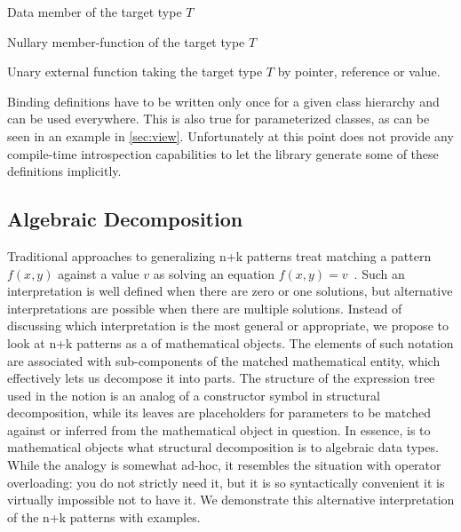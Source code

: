 \begin{compactitem}
\setlength{\itemsep}{0pt}
\setlength{\parskip}{0pt}
\item Data member of the target type $T$
\item Nullary member-function of the target type $T$
\item Unary external function taking the target type $T$ by pointer, reference or value.
\end{compactitem}

\noindent
Binding definitions have to be written only once for a given class hierarchy and 
can be used everywhere. This is also true for parameterized classes, as can be 
seen in an example in \textsection\ref{sec:view}. Unfortunately at this point 
\Cpp{} does not provide any compile-time introspection capabilities to let the 
library generate some of these definitions implicitly.

\subsection{Algebraic Decomposition}
\label{sec:slv}

Traditional approaches to generalizing n+k patterns treat matching a pattern 
$f(x,y)$ against a value $v$ as solving an equation $f(x,y)=v$~\cite{OosterhofThesis}. 
Such an interpretation is well defined when there are zero or one solutions,
but alternative interpretations are possible when there are multiple solutions. 
Instead of discussing which interpretation is the most general or appropriate, 
we propose to look at n+k patterns as a  of 
mathematical objects. The elements of such notation are associated with 
sub-components of the matched mathematical entity, which effectively lets us 
decompose it into parts. The structure of the expression tree used in the notion
is an analog of a constructor symbol in structural decomposition, while its 
leaves are placeholders for parameters to be matched against or inferred from 
the mathematical object in question. In essence,  
is to mathematical objects what structural decomposition is to algebraic data 
types. While the analogy is somewhat ad-hoc, it resembles the situation with 
operator overloading: you do not strictly need it, but it is so syntactically 
convenient it is virtually impossible not to have it. We demonstrate this 
alternative interpretation of the n+k patterns with examples.

